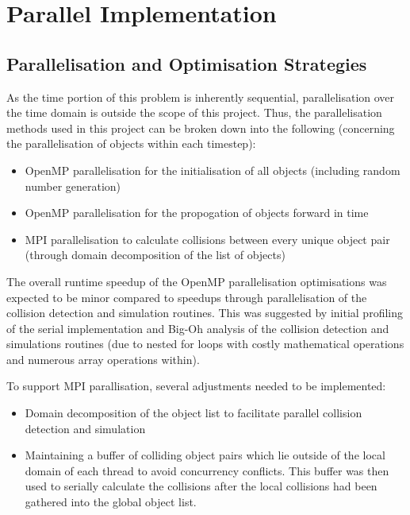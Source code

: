\documentclass[twoside,twocolumn]{article}
\begin{document}
	\section{Parallel Implementation}
	\subsection{Parallelisation and Optimisation Strategies}
	As the time portion of this problem is inherently sequential, parallelisation over the time domain is outside the scope of this project. \newline 
	Thus, the parallelisation methods used in this project can be broken down into the following (concerning the parallelisation of objects within each timestep):
	
	\begin{itemize}
		\item OpenMP parallelisation for the initialisation of all objects (including random number generation)
		\item OpenMP parallelisation for the propogation of objects forward in time
		\item MPI parallelisation to calculate collisions between every unique object pair (through domain decomposition of the list of objects)
	\end{itemize}
	
	The overall runtime speedup of the OpenMP parallelisation optimisations was expected to be minor compared to speedups through parallelisation of the collision detection and simulation routines. \newline
	This was suggested by initial profiling of the serial implementation and Big-Oh analysis of the collision detection and simulations routines (due to nested for loops with costly mathematical operations and numerous array operations within). \newline
	
	To support MPI parallisation, several adjustments needed to be implemented:
	
		\begin{itemize}
			\item Domain decomposition of the object list to facilitate parallel collision detection and simulation
			\item Maintaining a buffer of colliding object pairs which lie outside of the local domain of each thread to avoid concurrency conflicts.  \newline
			This buffer was then used to serially calculate the collisions after the local collisions had been gathered into the global object list. 
		\end{itemize}
		
\end{document}
